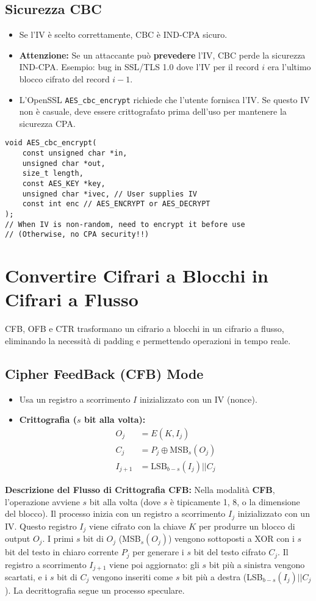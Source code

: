 \subsection{Sicurezza CBC}
\begin{itemize}
    \item Se l'IV è scelto correttamente, CBC è IND-CPA sicuro.
    \item \textbf{Attenzione:} Se un attaccante può \textbf{prevedere} l'IV, CBC perde la sicurezza IND-CPA. Esempio: bug in SSL/TLS 1.0 dove l'IV per il record $i$ era l'ultimo blocco cifrato del record $i-1$.
    \item L'OpenSSL \texttt{AES\_cbc\_encrypt} richiede che l'utente fornisca l'IV. Se questo IV non è casuale, deve essere crittografato prima dell'uso per mantenere la sicurezza CPA.
\end{itemize}
\begin{verbatim}
void AES_cbc_encrypt(
    const unsigned char *in,
    unsigned char *out,
    size_t length,
    const AES_KEY *key,
    unsigned char *ivec, // User supplies IV
    const int enc // AES_ENCRYPT or AES_DECRYPT
);
// When IV is non-random, need to encrypt it before use
// (Otherwise, no CPA security!!)
\end{verbatim}

\section{Convertire Cifrari a Blocchi in Cifrari a Flusso}
CFB, OFB e CTR trasformano un cifrario a blocchi in un cifrario a flusso, eliminando la necessità di padding e permettendo operazioni in tempo reale.

\subsection{Cipher FeedBack (CFB) Mode}
\begin{itemize}
    \item Usa un registro a scorrimento $I$ inizializzato con un IV (nonce).
    \item \textbf{Crittografia ($s$ bit alla volta):}
    \begin{align*}
        O_j &= E(K, I_j) \\
        C_j &= P_j \oplus \text{MSB}_s(O_j) \\
        I_{j+1} &= \text{LSB}_{b-s}(I_j) || C_j
    \end{align*}
\end{itemize}
\textbf{Descrizione del Flusso di Crittografia CFB:}
Nella modalità \textbf{CFB}, l'operazione avviene $s$ bit alla volta (dove $s$ è tipicamente 1, 8, o la dimensione del blocco). Il processo inizia con un registro a scorrimento $I_j$ inizializzato con un IV. Questo registro $I_j$ viene cifrato con la chiave $K$ per produrre un blocco di output $O_j$. I primi $s$ bit di $O_j$ (MSB$_s(O_j)$) vengono sottoposti a XOR con i $s$ bit del testo in chiaro corrente $P_j$ per generare i $s$ bit del testo cifrato $C_j$. Il registro a scorrimento $I_{j+1}$ viene poi aggiornato: gli $s$ bit più a sinistra vengono scartati, e i $s$ bit di $C_j$ vengono inseriti come $s$ bit più a destra (LSB$_{b-s}(I_j) || C_j$). La decrittografia segue un processo speculare.

